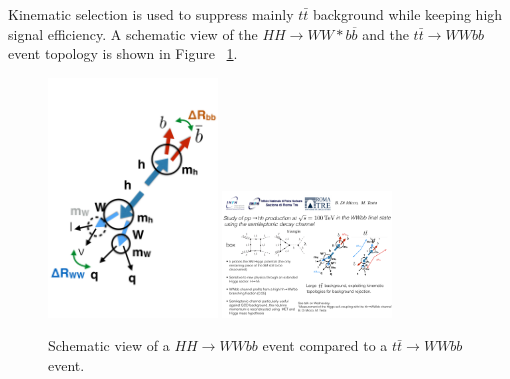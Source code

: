 Kinematic selection is used to suppress mainly $t\bar{t}$ background while keeping
high signal efficiency.  A schematic view of the $HH \to WW{*}b\overline{b}$ and the
$t \bar{t} \to WWbb$ event topology is shown in Figure ~\ref{fig:cartoon}.

\begin{figure}[h]
\begin{center}
\includegraphics[width=0.4\textwidth]{figures/cartoon_hh.pdf}
\includegraphics[width=0.4\textwidth]{figures/cartoon_tt.pdf}
\caption[Comparison signal and \ttbar events]{Schematic view of a $HH \to WWbb$ event compared to a $t\bar{t} \to WWbb$ event.} 
\label{fig:cartoon}
\end{center}
\end{figure}


